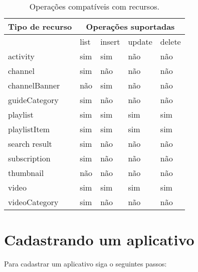 \begin{table}[ht]
\begin{tabular}{|p{6cm}|p{2cm}|p{2cm}|p{2cm}|p{2cm}|}
\hline
\rowcolor[HTML]{CFCFCF} 
Tipo de recurso	&\multicolumn{4}{|c|}{Operações suportadas}  \\ \hline
\ &	list	&	insert	&	update	&	delete	\\ \hline
activity	    &	sim		&	sim		&	não		&	não		\\ \hline
channel	        &	sim		&	não		&	não		&	não		\\ \hline
channelBanner	&	não		&	sim		&	não		&	não		\\ \hline
guideCategory	&	sim		&	não		&	não		&	não		\\ \hline
playlist	    &	sim		&	sim		&	sim		&	sim		\\ \hline
playlistItem	&	sim		&	sim		&	sim		&	sim		\\ \hline
search result	&	sim		&	não		&	não		&	não		\\ \hline
subscription	&	sim		&	não		&	não		&	não		\\ \hline
thumbnail	    &	não		&	não		&	não		&	não		\\ \hline
video	        &	sim		&	sim		&	sim		&	sim		\\ \hline
videoCategory	&	sim		&	não		&	não		&	não		\\ \hline
\end{tabular}
\caption[Operações compatíveis com recursos]{Operações compatíveis com recursos\cite{GettingStartedYoutubeAPI}.}
\label{fig: OperacoesCompativeisComRecursos}
\end{table}

\section{Cadastrando um aplicativo}
\label{sec: CadastrandoApp}

Para cadastrar um aplicativo siga o seguintes passos:

